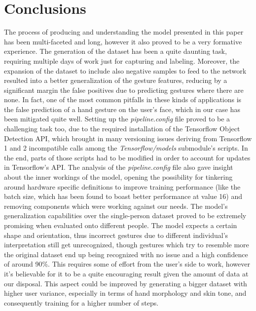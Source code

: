 \documentclass[10pt,twocolumn,letterpaper]{article}
\begin{document}
\section{Conclusions}
\begin{flushleft}
The process of producing and understanding the model presented in this paper has been multi-faceted and long, however it also proved to be a very formative experience.\linebreak
The generation of the dataset has been a quite daunting task, requiring multiple days of work just for capturing and labeling. Moreover, the expansion of the dataset to include also negative samples to feed to the network resulted into a better generalization of the gesture features, reducing by a significant margin the false positives due to predicting gestures where there are none. In fact, one of the most common pitfalls in these kinds of applications is the false prediction of a hand gesture on the user's face, which in our case has been mitigated quite well.\linebreak
Setting up the \textit{pipeline.config} file proved to be a challenging task too, due to the required installation of the Tensorflow Object Detection API, which brought in many versioning issues deriving from Tensorflow 1 and 2 incompatible calls among the \textit{Tensorflow/models} submodule's scripts. In the end, parts of those scripts had to be modified in order to account for updates in Tensorflow's API.\linebreak
The analysis of the \textit{pipeline.config} file also gave insight about the inner workings of the model, opening the possibility for tinkering around hardware specific definitions to improve training performance (like the batch size, which has been found to boast better performance at value 16) and removing components which were working against our needs.\linebreak
The model's generalization capabilities over the single-person dataset proved to be extremely promising when evaluated onto different people. The model expects a certain shape and orientation, thus incorrect gestures due to different individual's interpretation still get unrecognized, though gestures which try to resemble more the original dataset end up being recognized with no issue and a high confidence of around 90\%. This requires some of effort from the user's side to work, however it's believable for it to be a quite encouraging result given the amount of data at our disposal. This aspect could be improved by generating a bigger dataset with higher user variance, especially in terms of hand morphology and skin tone, and consequently training for a higher number of steps.\linebreak

\end{flushleft}
\end{document}
